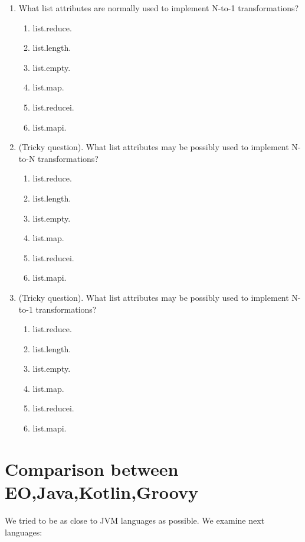 \documentclass[12pt]{book}
\begin{document}
\begin{enumerate}
    \item What list attributes are normally used to implement N-to-1 transformations?
    \begin{enumerate}
        \item list.reduce.
        \item list.length.
        \item list.empty.
        \item list.map.
        \item list.reducei.
        \item list.mapi.
    \end{enumerate}
    
    \item (Tricky question). What list attributes may be possibly used to implement N-to-N transformations?
    \begin{enumerate}
        \item list.reduce.
        \item list.length.
        \item list.empty.
        \item list.map.
        \item list.reducei.
        \item list.mapi.
    \end{enumerate}
    
    \item (Tricky question). What list attributes may be possibly used to implement N-to-1 transformations? 
    \begin{enumerate}
        \item list.reduce.
        \item list.length.
        \item list.empty.
        \item list.map.
        \item list.reducei.
        \item list.mapi.
    \end{enumerate}
\end{enumerate}


\chapter{Comparison between EO,Java,Kotlin,Groovy}
We tried to be as close to JVM languages as possible.
We examine next languages:
\end{document}
